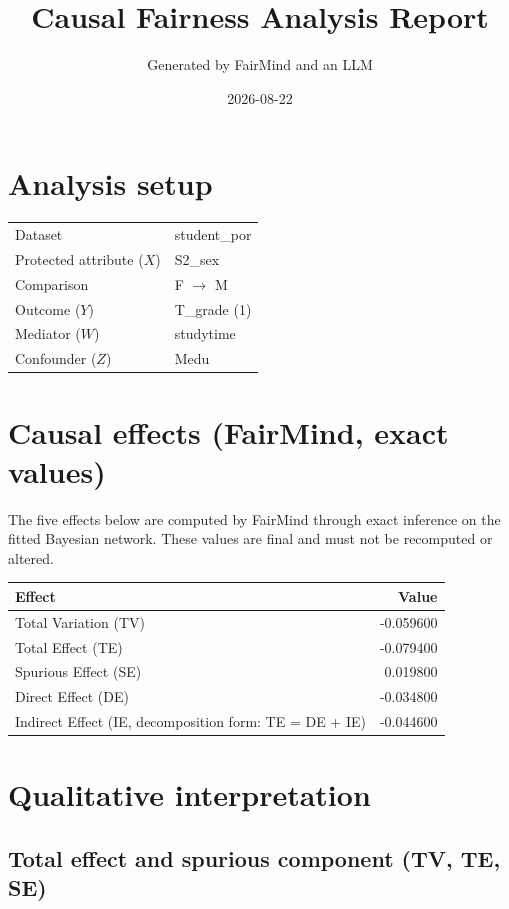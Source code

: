 \documentclass[11pt]{article}
\title{Causal Fairness Analysis Report}
\author{Generated by FairMind and an LLM}
\date{2026-08-22}
\begin{document}
\maketitle

\section{Analysis setup}

\begin{tabular}{ll}
\toprule
Dataset & student\_por \\
Protected attribute ($X$) & S2\_sex \\
Comparison & F $\to$ M \\
Outcome ($Y$) & T\_grade (1) \\
Mediator ($W$) & studytime \\
Confounder ($Z$) & Medu \\
\bottomrule
\end{tabular}

\section{Causal effects (FairMind, exact values)}

The five effects below are computed by FairMind through exact inference on the
fitted Bayesian network. These values are final and must not be recomputed or
altered.

\begin{tabular}{lr}
\toprule
Effect & Value \\
\midrule
Total Variation (TV) & -0.059600 \\
Total Effect (TE) & -0.079400 \\
Spurious Effect (SE) & 0.019800 \\
Direct Effect (DE) & -0.034800 \\
Indirect Effect (IE, decomposition form: TE = DE + IE) & -0.044600 \\
\bottomrule
\end{tabular}

\section{Qualitative interpretation}

\subsection{Total effect and spurious component (TV, TE, SE)}
\end{document}
